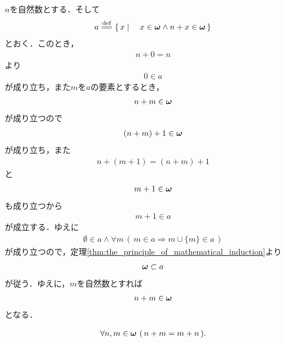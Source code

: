 	\begin{sketch}
		$n$を自然数とする．そして
		\begin{align}
			a \defeq \Set{x}{x \in \Natural \wedge n + x \in \Natural}
		\end{align}
		とおく．このとき，
		\begin{align}
			n + 0 = n
		\end{align}
		より
		\begin{align}
			0 \in a
		\end{align}
		が成り立ち，また$m$を$a$の要素とするとき，
		\begin{align}
			n + m \in {\boldsymbol \omega}
		\end{align}
		が成り立つので
		\begin{align}
			(n + m) + 1 \in {\boldsymbol \omega}
		\end{align}
		が成り立ち，また
		\begin{align}
			n + (m + 1) = (n + m) + 1
		\end{align}
		と
		\begin{align}
			m + 1 \in {\boldsymbol \omega}
		\end{align}
		も成り立つから
		\begin{align}
			m + 1 \in a
		\end{align}
		が成立する．ゆえに
		\begin{align}
			\emptyset \in a \wedge \forall m\, \left(\, m \in a \Longrightarrow m \cup \{m\} \in a\, \right)
		\end{align}
		が成り立つので，定理\ref{thm:the_principle_of_mathematical_induction}より
		\begin{align}
			{\boldsymbol \omega} \subset a
		\end{align}
		が従う．ゆえに，$m$を自然数とすれば
		\begin{align}
			n + m \in {\boldsymbol \omega}
		\end{align}
		となる．
		\QED
	\end{sketch}
	
	\begin{screen}
		\begin{thm}[自然数の和は可換]
			\begin{align}
				\forall n,m \in {\boldsymbol \omega}\ (\, n + m = m + n\, ).
			\end{align}
		\end{thm}
	\end{screen}